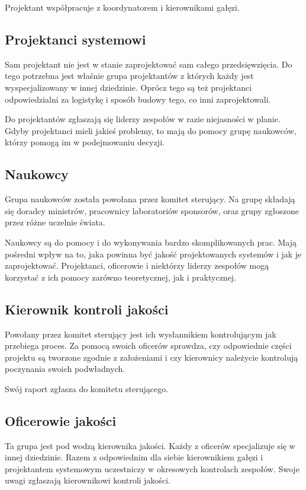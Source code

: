 Projektant współpracuje z koordynatorem i kierownikami gałęzi.

\subsection{Projektanci systemowi}
Sam projektant nie jest w stanie zaprojektować sam całego przedsięwzięcia.
Do tego potrzebna jest właśnie grupa projektantów z których każdy jest wyspecjalizowany w innej dziedzinie.
Oprócz tego są też projektanci odpowiedzialni za logistykę i sposób budowy tego, co inni zaprojektowali.

Do projektantów zgłaszają się liderzy zespołów w razie niejasności w planie.
Gdyby projektanci mieli jakieś problemy, to mają do pomocy grupę naukowców, którzy pomogą im w podejmowaniu decyzji.

\subsection{Naukowcy}
Grupa naukowców została powołana przez komitet sterujący.
Na grupę składają się doradcy ministrów, pracownicy laboratoriów sponsorów, oraz grupy zgłoszone przez różne uczelnie świata.

Naukowcy są do pomocy i do wykonywania bardzo skomplikowanych prac. 
Mają pośredni wpływ na to, jaka powinna być jakość projektowanych systemów i jak je zaprojektować.
Projektanci, oficerowie i niektórzy liderzy zespołów mogą korzystać z ich pomocy zarówno teoretycznej, jak i praktycznej.

\subsection{Kierownik kontroli jakości}
Powołany przez komitet sterujący jest ich wysłannikiem kontrolującym jak przebiega proces.
Za pomocą swoich oficerów sprawdza, czy odpowiednie części projektu są tworzone zgodnie z założeniami i czy kierownicy należycie kontrolują poczynania swoich podwładnych.

Swój raport zgłasza do komitetu sterującego.

\subsection{Oficerowie jakości}
Ta grupa jest pod wodzą kierownika jakości.
Każdy z oficerów specjalizuje się w innej dziedzinie.
Razem z odpowiednim dla siebie kierownikiem gałęzi i projektantem systemowym uczestniczy w okresowych kontrolach zespołów.
Swoje uwagi zgłaszają kierownikowi kontroli jakości.

